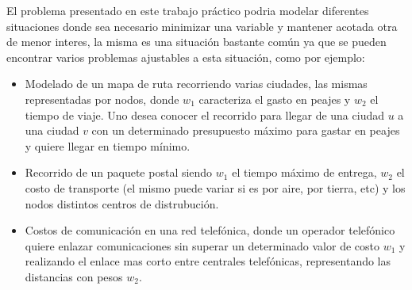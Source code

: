El problema presentado en este trabajo pr\'actico podria modelar diferentes situaciones donde sea necesario minimizar una variable y mantener acotada otra de menor interes, la misma es una situaci\'on bastante com\'un ya que se pueden encontrar varios problemas ajustables a esta situaci\'on, como por ejemplo:

\begin{itemize}
\item Modelado de un mapa de ruta recorriendo varias ciudades, las mismas representadas por nodos, donde $w_{1}$ caracteriza el gasto en peajes y $w_{2}$ el tiempo de viaje. Uno desea conocer el recorrido para llegar de una ciudad $u$ a una ciudad $v$ con un determinado presupuesto m\'aximo para gastar en peajes y quiere llegar en tiempo m\'inimo.
\item Recorrido de un paquete postal siendo $w_{1}$ el tiempo m\'aximo de entrega, $w_{2}$ el costo de transporte (el mismo puede variar si es por aire, por tierra, etc) y los nodos distintos centros de distrubuci\'on.
\item Costos de comunicaci\'on en una red telef\'onica, donde un operador telef\'onico quiere enlazar comunicaciones sin superar un determinado valor de costo $w_{1}$ y realizando el enlace mas corto entre centrales telef\'onicas, representando las distancias con pesos $w_{2}$.
\end{itemize} 